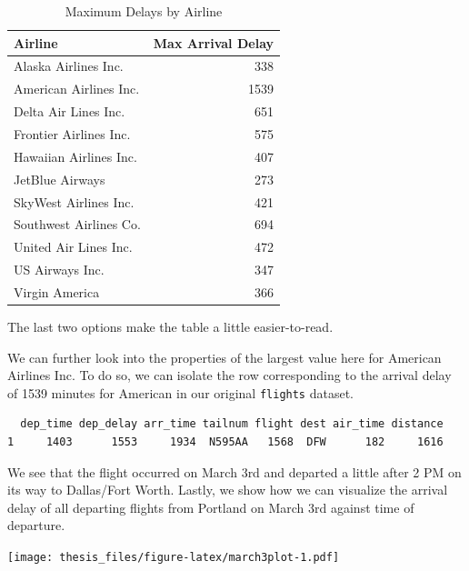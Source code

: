 \documentclass [11pt, proquest] {uwthesis}[2015/03/03]
\newenvironment{Shaded}{}{}
\newcommand{\KeywordTok}[1]{\textcolor[rgb]{0.00,0.44,0.13}{\textbf{{#1}}}}
\newcommand{\DataTypeTok}[1]{\textcolor[rgb]{0.56,0.13,0.00}{{#1}}}
\newcommand{\DecValTok}[1]{\textcolor[rgb]{0.25,0.63,0.44}{{#1}}}
\newcommand{\StringTok}[1]{\textcolor[rgb]{0.25,0.44,0.63}{{#1}}}
\newcommand{\NormalTok}[1]{{#1}}
\begin{document}
\begin{longtable}[t]{lr}
\caption[Max Delays by Airline]{\label{tab:maxdelays}Maximum Delays by Airline}\\
\toprule
Airline & Max Arrival Delay\\
\midrule
Alaska Airlines Inc. & 338\\
American Airlines Inc. & 1539\\
Delta Air Lines Inc. & 651\\
Frontier Airlines Inc. & 575\\
Hawaiian Airlines Inc. & 407\\
\addlinespace
JetBlue Airways & 273\\
SkyWest Airlines Inc. & 421\\
Southwest Airlines Co. & 694\\
United Air Lines Inc. & 472\\
US Airways Inc. & 347\\
Virgin America & 366\\
\bottomrule
\end{longtable}
The last two options make the table a little easier-to-read.

We can further look into the properties of the largest value here for
American Airlines Inc. To do so, we can isolate the row corresponding to
the arrival delay of 1539 minutes for American in our original
\texttt{flights} dataset.
\begin{Shaded}
\end{Shaded}
\begin{verbatim}
  dep_time dep_delay arr_time tailnum flight dest air_time distance
1     1403      1553     1934  N595AA   1568  DFW      182     1616
\end{verbatim}
We see that the flight occurred on March 3rd and departed a little after
2 PM on its way to Dallas/Fort Worth. Lastly, we show how we can
visualize the arrival delay of all departing flights from Portland on
March 3rd against time of departure.
\begin{Shaded}
\end{Shaded}
\texttt{[image: thesis\_files/figure-latex/march3plot-1.pdf]}
\end{document}
